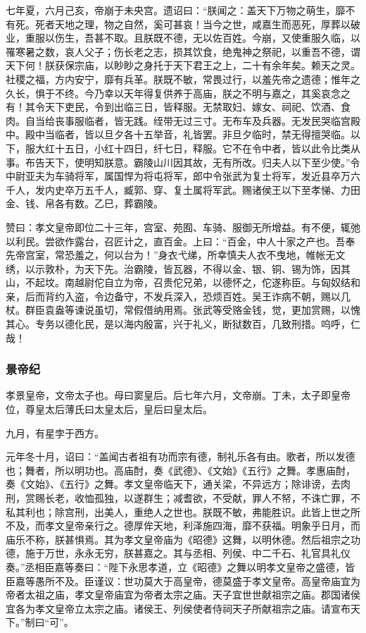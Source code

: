 \documentclass[]{article}
\begin{document}
七年夏，六月己亥，帝崩于未央宫。遗诏曰：``朕闻之：盖天下万物之萌生，靡不有死。死者天地之理，物之自然，奚可甚哀！当今之世，咸嘉生而恶死，厚葬以破业，重服以伤生，吾甚不取。且朕既不德，无以佐百姓。今崩，又使重服久临，以罹寒暑之数，哀人父子；伤长老之志，损其饮食，绝鬼神之祭祀，以重吾不德，谓天下何！朕获保宗庙，以眇眇之身托于天下君王之上，二十有余年矣。赖天之灵。社稷之福，方内安宁，靡有兵革。朕既不敏，常畏过行，以羞先帝之遗德；惟年之久长，惧于不终。今乃幸以天年得复供养于高庙，朕之不明与嘉之，其奚哀念之有！其令天下吏民，令到出临三日，皆释服。无禁取妇、嫁女、祠祀、饮酒、食肉。自当给丧事服临者，皆无践。绖带无过三寸。无布车及兵器。无发民哭临宫殿中。殿中当临者，皆以旦夕各十五举音，礼皆罢。非旦夕临时，禁无得擅哭临。以下，服大红十五日，小红十四日，纤七日，释服。它不在令中者，皆以此令比类从事。布告天下，使明知朕意。霸陵山川因其故，无有所改。归夫人以下至少使。''令中尉亚夫为车骑将军，属国悍为将屯将军，郎中令张武为复士将军，发近县卒万六千人，发内史卒万五千人，臧郭、穿、复土属将军武。赐诸侯王以下至孝悌、力田金、钱、帛各有数。乙巳，葬霸陵。

赞曰：孝文皇帝即位二十三年，宫室、苑囿、车骑、服御无所增益。有不便，辄弛以利民。尝欲作露台，召匠计之，直百金。上曰：``百金，中人十家之产也。吾奉先帝宫室，常恐羞之，何以台为！''身衣弋绨，所幸慎夫人衣不曳地，帷帐无文绣，以示敦朴，为天下先。治霸陵，皆瓦器，不得以金、银、铜、锡为饰，因其山，不起坟。南越尉佗自立为帝，召贵佗兄弟，以德怀之，佗遂称臣。与匈奴结和亲，后而背约入盗，令边备守，不发兵深入，恐烦百姓。吴王诈病不朝，赐以几杖。群臣袁盎等谏说虽切，常假借纳用焉。张武等受赂金钱，觉，更加赏赐，以愧其心。专务以德化民，是以海内殷富，兴于礼义，断狱数百，几致刑措。呜呼，仁哉！

\hypertarget{header-n287}{%
\subsubsection{景帝纪}\label{header-n287}}

孝景皇帝，文帝太子也。母曰窦皇后。后七年六月，文帝崩。丁未，太子即皇帝位，尊皇太后薄氏曰太皇太后，皇后曰皇太后。

九月，有星孛于西方。

元年冬十月，诏曰：``盖闻古者祖有功而宗有德，制礼乐各有由。歌者，所以发德也；舞者，所以明功也。高庙酎，奏《武德》、《文始》《五行》之舞。孝惠庙酎，奏《文始》、《五行》之舞。孝文皇帝临天下，通关梁，不异远方；除诽谤，去肉刑，赏赐长老，收恤孤独，以遂群生；减耆欲，不受献，罪人不帑，不诛亡罪，不私其利也；除宫刑，出美人，重绝人之世也。朕既不敏，弗能胜识。此皆上世之所不及，而孝文皇帝亲行之。德厚侔天地，利泽施四海，靡不获福。明象乎日月，而庙乐不称，朕甚惧焉。其为孝文皇帝庙为《昭德》这舞，以明休德。然后祖宗之功德，施于万世，永永无穷，朕甚嘉之。其与丞相、列侯、中二千石、礼官具礼仪奏。''丞相臣嘉等奏曰：``陛下永思孝道，立《昭德》之舞以明孝文皇帝之盛德，皆臣嘉等愚所不及。臣谨议：世功莫大于高皇帝，德莫盛于孝文皇帝。高皇帝庙宜为帝者太祖之庙，孝文皇帝庙宜为帝者太宗之庙。天子宜世世献祖宗之庙。郡国诸侯宜各为孝文皇帝立太宗之庙。诸侯王、列侯使者侍祠天子所献祖宗之庙。请宣布天下。''制曰``可''。
\end{document}
